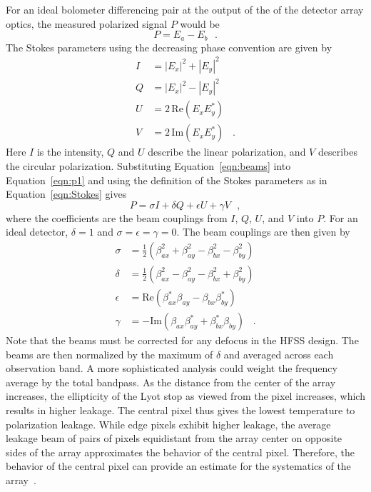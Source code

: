 For an ideal bolometer differencing pair at the output of the of the detector array optics, the measured polarized signal $P$ would be
\begin{equation}\label{eqn:p1}
P=E_a-E_b \,\,\,\,.
\end{equation}
The Stokes parameters using the decreasing phase convention are given by
\begin{align}\label{eqn:Stokes}
I & =  |E_{x}|^2+ |E_{y}|^2  \nonumber \\
Q & =   |E_{x}|^2- |E_{y}|^2  \nonumber \\
U & =  2\,\mathrm{Re}(E_{x} E_{y}^{*}) \nonumber \\
V & =  2\,\mathrm{Im}(E_{x} E_{y}^{*})\,\,\,\,\,.
\end{align}
Here $I$ is the intensity, $Q$ and $U$ describe the linear polarization, and $V$ describes the circular polarization. Substituting Equation~\ref{eqn:beams} into Equation~\ref{eqn:p1} and using the definition of the Stokes parameters  as in Equation~\ref{eqn:Stokes} gives
\begin{equation}
P=\sigma I + \delta Q + \epsilon U+ \gamma V\,\,\,\, ,
\end{equation}
where the coefficients are the beam couplings from $I$, $Q$, $U$, and $V$ into $P$. For an ideal detector, $\delta=1$ and $\sigma=\epsilon=\gamma=0$. The beam couplings are then given by
\begin{align}\label{eqn:leakage beams}
\sigma & =  \frac{1}{2} (\beta_{ax}^2 + \beta_{ay}^2 - \beta_{bx}^2 - \beta_{by}^2) \\
\delta & =   \frac{1}{2} (\beta_{ax}^2 - \beta_{ay}^2 - \beta_{bx}^2 + \beta_{by}^2) \\
\epsilon & =  \mathrm{Re}(\beta_{ax}^{*} \beta_{ay} - \beta_{bx}\beta_{by}^{*} )  \\
\gamma & =  -\mathrm{Im}(\beta_{ax} \beta_{ay}^{*} + \beta_{bx}^{*}\beta_{by} )\,\,\,\,\,.
\end{align}
Note that the beams must be corrected for any defocus in the HFSS design. The beams are then normalized by the maximum of $\delta$ and averaged across each observation band. A more sophisticated analysis could weight the frequency average by the total bandpass. As the distance from the center of the array increases, the ellipticity of the Lyot stop as viewed from the pixel increases, which results in higher leakage. The central pixel thus gives the lowest temperature to polarization leakage. While edge pixels exhibit higher leakage, the average leakage beam of pairs of pixels equidistant from the array center on opposite sides of the array approximates the behavior of the central pixel. Therefore, the behavior of the central pixel can provide an estimate for the systematics of the array~\cite{Simon_Thesis_2016}.

